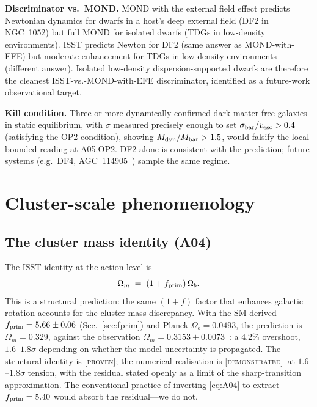 \documentclass[aps,prd,twocolumn,nofootinbib,floatfix,superscriptaddress]{revtex4-2}
\newcommand{\PROVEN}{{\color{black!75!green}\textsc{[proven]}}}
\newcommand{\DEMO}{{\color{black!70!blue}\textsc{[demonstrated]}}}
\newcommand{\fprim}{f_{\rm prim}}
\begin{document}
\textbf{Discriminator vs.\ MOND.} MOND with the external field effect
predicts Newtonian dynamics for dwarfs in a host's deep external field
(DF2 in NGC~1052) but full MOND for isolated dwarfs (TDGs in
low-density environments). ISST predicts Newton for DF2 (same answer
as MOND-with-EFE) but moderate enhancement for TDGs in low-density
environments (different answer). Isolated low-density
dispersion-supported dwarfs are therefore the cleanest
ISST-vs.-MOND-with-EFE discriminator, identified as a future-work
observational target.

\textbf{Kill condition.} Three or more dynamically-confirmed
dark-matter-free galaxies in static equilibrium, with $\sigma$
measured precisely enough to set $\sigma_{\rm bar}/v_{\rm esc} > 0.4$
(satisfying the OP2 condition), showing $M_{\rm dyn}/M_{\rm bar} > 1.5$,
would falsify the local-bounded reading at A05.OP2. DF2 alone is
consistent with the prediction; future systems
(e.g.\ DF4, AGC~114905~\cite{Mancera2022}) sample the same regime.

\section{Cluster-scale phenomenology}
\label{sec:cluster}

\subsection{The cluster mass identity (A04)}

The ISST identity at the action level is
\begin{equation}
\label{eq:A04}
\Omega_m \;=\; (1+\fprim)\,\Omega_b.
\end{equation}
This is a structural prediction: the same $(1{+}f)$ factor that
enhances galactic rotation accounts for the cluster mass
discrepancy. With the SM-derived $\fprim = 5.66\pm 0.06$
(Sec.~\ref{sec:fprim}) and Planck $\Omega_b = 0.0493$, the
prediction is $\Omega_m = 0.329$, against the observation $\Omega_m
= 0.3153\pm 0.0073$~\cite{Planck2018}: a $4.2\%$ overshoot,
$1.6$--$1.8\sigma$ depending on whether the model uncertainty is
propagated. The structural identity is \PROVEN; the numerical
realisation is \DEMO\ at $1.6$--$1.8\sigma$ tension, with the
residual stated openly as a limit of the sharp-transition
approximation. The conventional
practice of inverting \eqref{eq:A04} to extract $\fprim = 5.40$
would absorb the residual---we do not.
\end{document}

